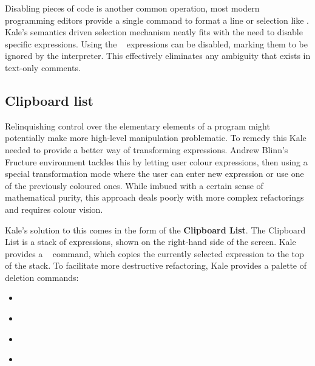 Disabling pieces of code is another common operation, most modern programming
editors provide a single command to format a line or selection like
\keys{\ctrl + /}. Kale's semantics driven selection mechanism neatly fits with
the need to disable specific expressions. Using the
\hyperref[cmd:disable]{}~\keys{\textbackslash} expressions can be
disabled, marking them to be ignored by the interpreter. This effectively
eliminates any ambiguity that exists in text-only comments.

\subsection{Clipboard list}

Relinquishing control over the elementary elements of a program might
potentially make more high-level manipulation problematic. To remedy this
Kale needed to provide a better way of transforming expressions. Andrew Blinn's
Fructure \cite{Fructure} environment tackles this by letting user colour
expressions, then
using a special transformation mode where the user can enter new expression or
use one of the previously coloured ones. While imbued with a certain sense of
mathematical purity, this approach deals poorly with more complex refactorings
and requires colour vision.

Kale's solution to this comes in the form of the \textbf{Clipboard List}. The
Clipboard List is a stack of expressions, shown on the right-hand side of the
screen. Kale provides a \hyperref[cmd:copy]{}~ command, which
copies the currently
selected expression to the top of the stack. To facilitate more destructive
refactoring, Kale provides a palette of deletion commands:

\begin{itemize}[noitemsep]
	\item \hyperref[cmd:delete]{} \keys{\backspace}
	\item \hyperref[cmd:cut]{} 
	\item \hyperref[cmd:delete_blank]{} 
	\item \hyperref[cmd:cut_blank]{} 
\end{itemize}

